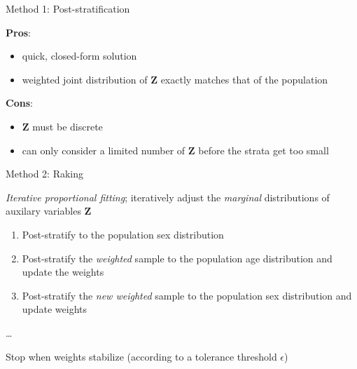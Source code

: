 \documentclass[
  ignorenonframetext,
]{beamer}
\providecommand{\tightlist}{%
  \setlength{\itemsep}{0pt}\setlength{\parskip}{0pt}}
\begin{document}
\begin{frame}{Method 1: Post-stratification}
\protect\hypertarget{method-1-post-stratification-1}{}

\textbf{Pros}:

\begin{itemize}
\tightlist
\item
  quick, closed-form solution
\item
  weighted joint distribution of \(\mathbf{Z}\) exactly matches that of
  the population
\end{itemize}

\textbf{Cons}:

\begin{itemize}
\tightlist
\item
  \(\mathbf{Z}\) must be discrete
\item
  can only consider a limited number of \(\mathbf{Z}\) before the strata
  get too small
\end{itemize}

\end{frame}

\begin{frame}{Method 2: Raking}
\protect\hypertarget{method-2-raking}{}

\emph{Iterative proportional fitting}; iteratively adjust the
\emph{marginal} distributions of auxilary variables \(\mathbf{Z}\)

\begin{enumerate}
\item
  Post-stratify to the population sex distribution
\item
  Post-stratify the \emph{weighted} sample to the population age
  distribution and update the weights
\item
  Post-stratify the \emph{new weighted} sample to the population sex
  distribution and update weights
\end{enumerate}

\ldots{}

Stop when weights stabilize (according to a tolerance threshold
\(\epsilon\))

\end{frame}
\end{document}
